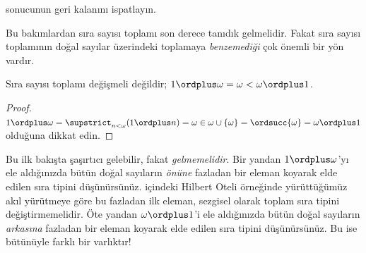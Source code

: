 \documentclass[../../../include/open-logic-section]{subfiles}
\begin{document}
\begin{prob}
 sonucunun geri
kalanını ispatlayın.
\end{prob}

Bu bakımlardan sıra sayısı toplamı son derece tanıdık gelmelidir. Fakat sıra
sayısı toplamının doğal sayılar üzerindeki toplamaya 
\emph{benzemediği} çok
önemli bir yön vardır.

\begin{prop}
Sıra sayısı toplamı {değişmeli} değildir;
$1\ordplus\omega=\omega<\omega\ordplus1$.
\end{prop}

\begin{proof}
$1\ordplus\omega=\supstrict_{n<\omega}(1\ordplus n)
=\omega\in\omega\cup\{\omega\}=\ordsucc{\omega}=\omega\ordplus1$
olduğuna dikkat edin.
\end{proof}
\noindent
Bu ilk bakışta şaşırtıcı gelebilir, fakat 
\emph{gelmemelidir}. Bir yandan
$1\ordplus\omega$'yı ele aldığınızda bütün doğal sayıların
\emph{önüne} fazladan bir eleman koyarak elde edilen sıra tipini
düşünürsünüz.  içindeki Hilbert Oteli
örneğinde yürüttüğümüz akıl yürütmeye göre bu fazladan ilk eleman, sezgisel
olarak toplam sıra tipini değiştirmemelidir. Öte yandan
$\omega\ordplus1$'i ele aldığınızda bütün doğal sayıların 
\emph{arkasına}
fazladan bir eleman koyarak elde edilen sıra tipini düşünürsünüz. Bu ise
bütünüyle farklı bir varlıktır!
\end{document}
